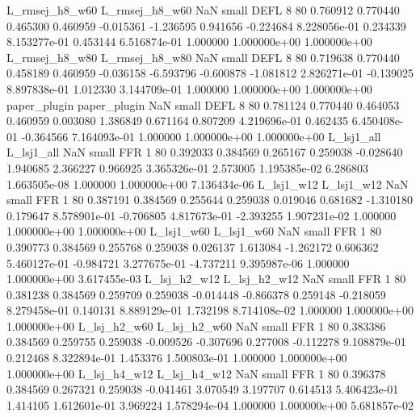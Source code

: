 L_rmsej_h8_w60 L_rmsej_h8_w60                   NaN      small     DEFL                 8 80 0.760912       0.770440 0.465300       0.460959   -0.015361     -1.236595      0.941656    -0.224684   8.228056e-01  0.234339 8.153277e-01     0.453144   6.516874e-01            1.000000    1.000000e+00        1.000000e+00
L_rmsej_h8_w80 L_rmsej_h8_w80                   NaN      small     DEFL                 8 80 0.719638       0.770440 0.458189       0.460959   -0.036158     -6.593796     -0.600878    -1.081812   2.826271e-01 -0.139025 8.897838e-01     1.012330   3.144709e-01            1.000000    1.000000e+00        1.000000e+00
  paper_plugin   paper_plugin                   NaN      small     DEFL                 8 80 0.781124       0.770440 0.464053       0.460959    0.003080      1.386849      0.671164     0.807209   4.219696e-01  0.462435 6.450408e-01    -0.364566   7.164093e-01            1.000000    1.000000e+00        1.000000e+00
    L_lsj1_all     L_lsj1_all                   NaN      small      FFR                 1 80 0.392033       0.384569 0.265167       0.259038   -0.028640      1.940685      2.366227     0.966925   3.365326e-01  2.573005 1.195385e-02     6.286803   1.663505e-08            1.000000    1.000000e+00        7.136434e-06
    L_lsj1_w12     L_lsj1_w12                   NaN      small      FFR                 1 80 0.387191       0.384569 0.255644       0.259038    0.019046      0.681682     -1.310180     0.179647   8.578901e-01 -0.706805 4.817673e-01    -2.393255   1.907231e-02            1.000000    1.000000e+00        1.000000e+00
    L_lsj1_w60     L_lsj1_w60                   NaN      small      FFR                 1 80 0.390773       0.384569 0.255768       0.259038    0.026137      1.613084     -1.262172     0.606362   5.460127e-01 -0.984721 3.277675e-01    -4.737211   9.395987e-06            1.000000    1.000000e+00        3.617455e-03
  L_lsj_h2_w12   L_lsj_h2_w12                   NaN      small      FFR                 1 80 0.381238       0.384569 0.259709       0.259038   -0.014448     -0.866378      0.259148    -0.218059   8.279458e-01  0.140131 8.889129e-01     1.732198   8.714108e-02            1.000000    1.000000e+00        1.000000e+00
  L_lsj_h2_w60   L_lsj_h2_w60                   NaN      small      FFR                 1 80 0.383386       0.384569 0.259755       0.259038   -0.009526     -0.307696      0.277008    -0.112278   9.108879e-01  0.212468 8.322894e-01     1.453376   1.500803e-01            1.000000    1.000000e+00        1.000000e+00
  L_lsj_h4_w12   L_lsj_h4_w12                   NaN      small      FFR                 1 80 0.396378       0.384569 0.267321       0.259038   -0.041461      3.070549      3.197707     0.614513   5.406423e-01  1.414105 1.612601e-01     3.969224   1.578294e-04            1.000000    1.000000e+00        5.681857e-02
